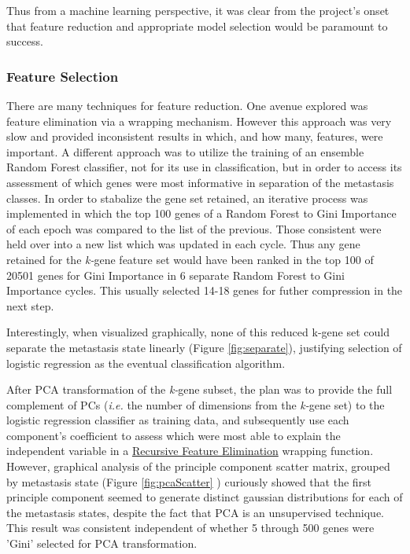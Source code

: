 \documentclass[final]{article}
\begin{document}
Thus from a machine learning perspective, it was clear from the project's onset
that feature reduction and appropriate model selection would be paramount to
success.

\subsubsection{Feature Selection}

There are many techniques for feature reduction.  One avenue explored was
feature elimination via a wrapping mechanism.  However this approach was very
slow and provided inconsistent results in which, and how many, features,
were important. A different approach was to utilize the training of an ensemble
Random Forest classifier, not for its use in classification, but in order to
access its assessment of which genes were most informative in separation of the
metastasis classes.  In order to stabalize the gene set retained, an iterative
process was implemented in which the top 100 genes of a Random Forest to Gini Importance
of each epoch was compared to the list of the previous.  Those consistent were
held over into a new list which was updated in each cycle.  Thus any gene retained
for the \textit{k-}gene feature set would have been ranked in the top 100 of 20501
genes for Gini Importance in 6 separate Random Forest to Gini Importance cycles.  This
usually selected 14-18 genes for futher compression in the next step.

Interestingly, when visualized graphically, none of this reduced k-gene set
could separate the metastasis state linearly (Figure \ref{fig:separate}),
justifying selection of logistic regression as the eventual classification
algorithm.

After PCA transformation of the \textit{k-}gene subset, the plan was to provide
the full complement of PCs (\textit{i.e.} the number of dimensions from the
\textit{k-}gene set) to the logistic regression classifier as training data, and
subsequently use each component's coefficient to  assess which were most able to
explain the independent variable in a
\href{http://scikit-learn.org/0.15/modules/generated/sklearn.feature_selection.RFECV.html#sklearn.feature_selection.RFECV}{Recursive
Feature Elimination} wrapping function.  However, graphical analysis of the
principle component scatter matrix, grouped by metastasis state (Figure
\ref{fig:pcaScatter} ) curiously showed that the first principle component
seemed to generate distinct gaussian distributions for each of the metastasis
states, despite the fact that PCA is an unsupervised technique.  This result was
consistent independent of whether 5 through 500 genes were 'Gini' selected for
PCA transformation.
\end{document}
